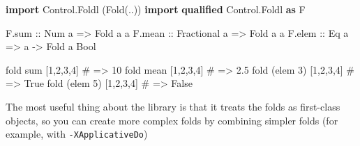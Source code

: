 \documentclass[]{article}
\newenvironment{Shaded}{}{}
\newcommand{\CommentTok}[1]{\textcolor[rgb]{0.38,0.63,0.69}{\textit{#1}}}
\newcommand{\DataTypeTok}[1]{\textcolor[rgb]{0.56,0.13,0.00}{#1}}
\newcommand{\DecValTok}[1]{\textcolor[rgb]{0.25,0.63,0.44}{#1}}
\newcommand{\FunctionTok}[1]{\textcolor[rgb]{0.02,0.16,0.49}{#1}}
\newcommand{\KeywordTok}[1]{\textcolor[rgb]{0.00,0.44,0.13}{\textbf{#1}}}
\newcommand{\NormalTok}[1]{#1}
\newcommand{\OperatorTok}[1]{\textcolor[rgb]{0.40,0.40,0.40}{#1}}
\newcommand{\OtherTok}[1]{\textcolor[rgb]{0.00,0.44,0.13}{#1}}
\newcommand{\PreprocessorTok}[1]{\textcolor[rgb]{0.74,0.48,0.00}{#1}}
\begin{document}
\begin{Shaded}
\begin{Highlighting}[]
\KeywordTok{import}           \DataTypeTok{Control.Foldl}\NormalTok{   (}\DataTypeTok{Fold}\NormalTok{(..))}
\KeywordTok{import} \KeywordTok{qualified} \DataTypeTok{Control.Foldl}   \KeywordTok{as} \DataTypeTok{F}

\NormalTok{F.sum}\OtherTok{  ::} \DataTypeTok{Num}\NormalTok{ a        }\OtherTok{=>} \DataTypeTok{Fold}\NormalTok{ a a}
\NormalTok{F.mean}\OtherTok{ ::} \DataTypeTok{Fractional}\NormalTok{ a }\OtherTok{=>} \DataTypeTok{Fold}\NormalTok{ a a}
\NormalTok{F.elem}\OtherTok{ ::} \DataTypeTok{Eq}\NormalTok{ a         }\OtherTok{=>}\NormalTok{ a }\OtherTok{{-}>} \DataTypeTok{Fold}\NormalTok{ a }\DataTypeTok{Bool}

\NormalTok{fold }\FunctionTok{sum}\NormalTok{  [}\DecValTok{1}\NormalTok{,}\DecValTok{2}\NormalTok{,}\DecValTok{3}\NormalTok{,}\DecValTok{4}\NormalTok{]}
\PreprocessorTok{\#   => 10}
\NormalTok{fold mean [}\DecValTok{1}\NormalTok{,}\DecValTok{2}\NormalTok{,}\DecValTok{3}\NormalTok{,}\DecValTok{4}\NormalTok{]}
\PreprocessorTok{\#   => 2.5}
\NormalTok{fold (}\FunctionTok{elem} \DecValTok{3}\NormalTok{) [}\DecValTok{1}\NormalTok{,}\DecValTok{2}\NormalTok{,}\DecValTok{3}\NormalTok{,}\DecValTok{4}\NormalTok{]}
\PreprocessorTok{\#   => True}
\NormalTok{fold (}\FunctionTok{elem} \DecValTok{5}\NormalTok{) [}\DecValTok{1}\NormalTok{,}\DecValTok{2}\NormalTok{,}\DecValTok{3}\NormalTok{,}\DecValTok{4}\NormalTok{]}
\PreprocessorTok{\#   => False}
\end{Highlighting}
\end{Shaded}

The most useful thing about the library is that it treats the folds as
first-class objects, so you can create more complex folds by combining simpler
folds (for example, with \texttt{-XApplicativeDo})

\begin{Shaded}
\end{Shaded}
\end{document}
